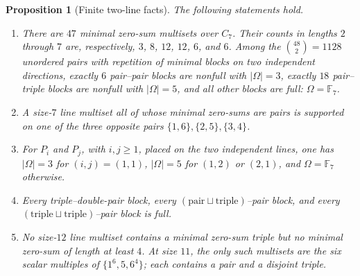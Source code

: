 \documentclass[11pt]{amsart}
\newtheorem{proposition}[theorem]{Proposition}
\theoremstyle{definition}
\newcommand{\F}{\mathbb F}
\newcommand{\Om}{\Omega}
\begin{document}
\begin{proposition}[Finite two-line facts]\label{prop:Ffacts}
The following statements hold.
\begin{enumerate}[label=(F\arabic*)]
\item There are $47$ minimal zero-sum multisets over $C_7$. Their counts in lengths $2$ through $7$ are, respectively, $3$, $8$, $12$, $12$, $6$, and $6$. Among the $\binom{48}{2}=1128$ unordered pairs with repetition of minimal blocks on two independent directions, exactly $6$ pair--pair blocks are nonfull with $|\Om|=3$, exactly $18$ pair--triple blocks are nonfull with $|\Om|=5$, and all other blocks are full: $\Om=\F_7$.
\item A size-$7$ line multiset all of whose minimal zero-sums are pairs is supported on one of the three opposite pairs $\{1,6\},\{2,5\},\{3,4\}$.
\item For $P_i$ and $P_j$, with $i,j\geq1$, placed on the two independent lines, one has $|\Om|=3$ for $(i,j)=(1,1)$, $|\Om|=5$ for $(1,2)$ or $(2,1)$, and $\Om=\F_7$ otherwise.
\item Every triple--double-pair block, every $(\text{pair}\sqcup\text{triple})$--pair block, and every $(\text{triple}\sqcup\text{triple})$--pair block is full.
\item No size-$12$ line multiset contains a minimal zero-sum triple but no minimal zero-sum of length at least $4$. At size $11$, the only such multisets are the six scalar multiples of $\{1^6,5,6^4\}$; each contains a pair and a disjoint triple.
\end{enumerate}
\end{proposition}
\end{document}
